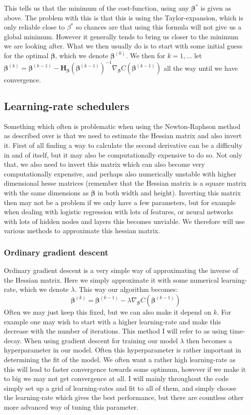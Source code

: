 \documentclass{article}
\begin{document}
This tells us that the minimum of the cost-function, using any $\bm{\beta}^*$ is
given as above. The problem with this is that this is using the
Taylor-expansion, which is only reliable close to $\beta^*$ so chances are that
using this formula will not give us a global minimum. However it generally tends
to bring us closer to the minimum we are looking after. What we then usually do
is to start with some initial guess for the optimal $\bm{\beta}$, which we
denote $\bm{\beta}^{(0)}$. We then for $k=1, \dots$ let $\bm{\beta}^{(k)} =
      \bm{\beta}^{(k-1)} - \bm{H}_{\bm{\beta}}(\bm{\beta}^{(k-1)})^{-1}
      \nabla_{\bm{\beta}} C(\bm{\beta}^{(k-1)})$ all the way until we have convergence.

\subsection{Learning-rate schedulers}
Something which often is problematic when using the Newton-Raphson method as
described over is that we need to estimate the Hessian matrix and also invert
it. First of all finding a way to calculate the second derivative can be a
difficulty in and of itself, but it may also be computationally expensive to do
so. Not only that, we also need to invert this matrix which can also become very
computationally expensive, and perhaps also numerically unstable with higher
dimensional hesse matrices (remember that the Hessian matrix is a square matrix
with the same dimensions as $\bm{\beta}$ in both width and height).  Inverting
this matrix then may not be a problem if we only have a few parameters, but for
example when dealing with logistic regression with lots of features, or neural
networks with lots of hidden nodes and layers this becomes unviable. We
therefore will use various methods to approximate this hessian matrix.

\subsubsection{Ordinary gradient descent}
Ordinary gradient descent is a very simple way of approximating the inverse of
the Hessian matrix. Here we simply approximate it with some numerical
learning-rate, which we denote $\lambda$. This way our algorithm becomes:
$$\bm{\beta}^(k) = \bm{\beta}^{(k-1)} - \lambda \nabla_{\bm{\beta}} C(\bm{\beta}^{(k-1)})$$
Often we may just keep this fixed, but we can also make it depend on $k$. For
example one may wish to start with a higher learning-rate and make this decrease
with the number of iterations. This method I will refer to as using time-decay.
When using gradient descent for training our model $\lambda$ then becomes a
hyperparameter in our model. Often this hyperparameter is rather important in
determining the fit of the model. We often want a rather high learning-rate as
this will lead to faster convergence towards some optimum, however if we make it
to big we may not get convergence at all. I will mainly throughout the code
simply set up a grid of learning-rates and fit to all of them, and simply choose
the learning-rate which gives the best performance, but there are countless
other more advanced way of tuning this parameter.
\end{document}
